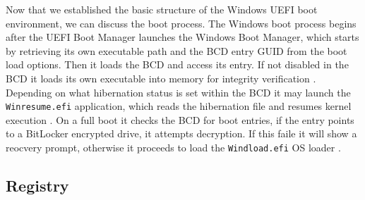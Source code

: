 Now that we established the basic structure of the Windows UEFI boot environment, we can discuss the boot process.
The Windows boot process begins after the UEFI Boot Manager launches the Windows Boot Manager, which starts by retrieving its own executable path and the \ac{BCD} entry GUID from the boot load options.
Then it loads the \ac{BCD} and access its entry.
If not disabled in the \ac{BCD} it loads its own executable into memory for integrity verification \cite[12. The Windows Boot Manager]{windows-internals-7-part2}.
Depending on what hibernation status is set within the \ac{BCD} it may launch the \lstinline{Winresume.efi} application, which reads the hibernation file and resumes kernel execution \cite[12. Launching a boot application]{windows-internals-7-part2}.
On a full boot it checks the \ac{BCD} for boot entries, if the entry points to a BitLocker encrypted drive, it attempts decryption.
If this faile it will show a reocvery prompt, otherwise it proceeds to load the \lstinline{Windload.efi} \ac{OS} loader \cite[12. Launching a boot application]{windows-internals-7-part2}.

\cite[12. Launching a boot application]{windows-internals-7-part2}


\subsection{Registry}

